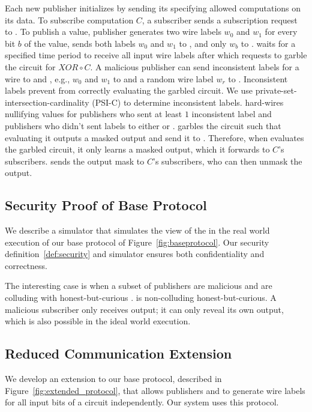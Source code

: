 Each new publisher initializes by sending its \policy specifying allowed
computations on its data. To subscribe computation $C$, a subscriber sends a
subscription request to \broker.  To publish a value, publisher generates two
wire labels $w_0$ and $w_1$ for every bit $b$ of the value, sends both labels
$w_0$ and $w_1$ to \garbler, and only $w_b$ to \broker. \broker waits for a
specified time period to receive all input wire labels after which \broker
requests \garbler to garble the circuit for $XOR \circ C$.  A malicious
publisher can send inconsistent labels for a wire to \broker and \garbler,
e.g., $w_0$ and $w_1$ to \garbler and a random wire label $w_r$ to \broker.
Inconsistent labels prevent \garbler from correctly evaluating the garbled
circuit. We use private-set-intersection-cardinality (PSI-C) to determine
inconsistent labels. \garbler hard-wires nullifying values for publishers who
sent at least $1$ inconsistent label and publishers who didn't sent labels to
either \broker or \garbler. \garbler garbles the circuit such that evaluating
it outputs a masked output and send it to \broker.  Therefore, when \broker
evaluates the garbled circuit, it only learns a masked output, which it
forwards to $C$'s subscribers. \garbler sends the output mask to $C$'s
subscribers, who can then unmask the output.

\subsection{Security Proof of Base Protocol}
We describe a simulator \Sim that simulates the view of the \Adv in the real
world execution of our base protocol of Figure~\ref{fig:baseprotocol}. Our
security definition~\ref{def:security} and simulator \Sim ensures both
confidentiality and correctness.

The interesting case is when a subset of publishers are malicious and are
colluding with honest-but-curious \broker. \garbler is non-colluding
honest-but-curious. A malicious subscriber only receives output; it can only
reveal its own output, which is also possible in the ideal world execution.\\[6pt]


\vspace{-8pt}
\subsection{Reduced Communication Extension}


We develop an extension to our base protocol, described in
Figure~\ref{fig:extended_protocol}, that allows publishers and \garbler to
generate wire labels for all input bits of a circuit independently.  Our system
uses this protocol.

